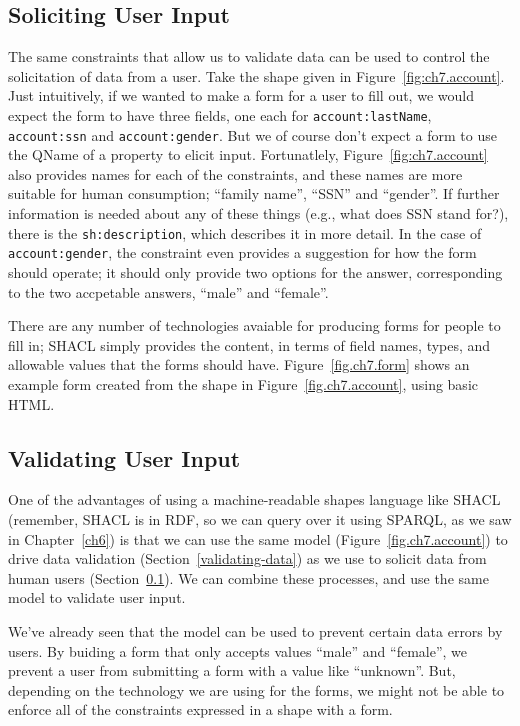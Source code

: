 \subsection{Soliciting User Input}\label{soliciting}

The same constraints that allow us to validate data can be used to
control the solicitation of data from a user.  Take the shape given in
Figure~\ref{fig:ch7.account}.  Just intuitively, if we wanted to make
a form for a user to fill out, we would expect the form to have three
fields, one each for \texttt{account:lastName}, \texttt{account:ssn}
and \texttt{account:gender}.  But we of course don't expect a form to
use the QName of a property to elicit input.  Fortunatlely,
Figure~\ref{fig:ch7.account} also provides names for each of the
constraints, and these names are more suitable for human consumption;
``family name'', ``SSN'' and ``gender''.  If further information is
needed about any of these things (e.g., what does SSN stand for?),
there is the \texttt{sh:description}, which describes it in more
detail.  In the case of \texttt{account:gender}, the constraint even
provides a suggestion for how the form should operate; it should only
provide two options for the answer, corresponding to the two
accpetable answers, ``male'' and ``female''.

There are any number of technologies avaiable for producing forms for
people to fill in; SHACL simply provides the content, in terms of
field names, types, and allowable values that the forms should have.
Figure~\ref{fig.ch7.form} shows an example form created from the shape
in Figure~\ref{fig.ch7.account}, using basic HTML.



\subsection{Validating User Input}\label{vuser}

One of the advantages of using a machine-readable shapes language like
SHACL (remember, SHACL is in RDF, so we can query over it using
SPARQL, as we saw in Chapter~\ref{ch6}) is that we can use the same
model (Figure~\ref{fig.ch7.account}) to drive data validation
(Section~\ref{validating-data}) as we use to solicit data from human
users (Section~\ref{soliciting}).  We can combine these processes, and
use the same model to validate user input.

We've already seen that the model can be used to prevent certain data
errors by users.  By buiding a form that only accepts values ``male''
and ``female'', we prevent a user from submitting a form with a value
like ``unknown''.  But, depending on the technology we are using for
the forms, we might not be able to enforce all of the constraints
expressed in a shape with a form.

